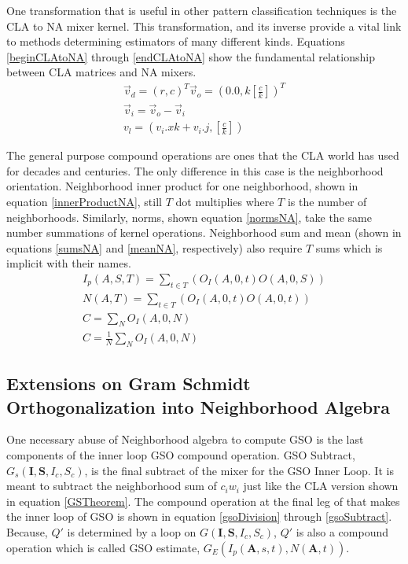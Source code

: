 \documentclass[11pt]{article}
\begin{document}
One transformation that is useful in other pattern classification techniques is the CLA to NA mixer kernel.  This transformation, and its inverse provide a vital link to methods determining estimators of many different kinds.  Equations \ref{beginCLAtoNA} through \ref{endCLAtoNA}  show the fundamental relationship between CLA matrices and NA mixers.  
\begin{eqnarray}
	\vec{v}_d = (r, c)^T \label{beginCLAtoNA}
	\vec{v}_o = (0.0, k  [\frac{c}{k}] )^T \\
	\vec{v}_i = \vec{v}_o - \vec{v}_i \\
	v_l = (v_i.x k + v_i.j , [\frac{c}{k}] )  \label{endCLAtoNA}
\end{eqnarray}

The general purpose compound operations are ones that the CLA world has used for decades and centuries.  The only difference in this case is the neighborhood orientation.  Neighborhood inner product for one neighborhood, shown in equation \ref{innerProductNA}, still $T$ dot multiplies where $T$ is the number of neighborhoods.  Similarly, norms, shown equation \ref{normsNA}, take the same number summations of kernel operations.   Neighborhood sum and mean (shown in equations \ref{sumsNA} and \ref{meanNA}, respectively) also require $T$ sums which is implicit with their names.
\begin{eqnarray}
	I_p(A, S, T) = \sum_{t \in T} (O_I(A,0,t) O(A,0,S)) \label{innerProductNA} \\
	N(A, T) = \sum_{t \in T} (O_I(A,0,t) O(A,0,t)) \label{normsNA} \\
	C = \sum _N O_I (A, 0, N ) \label{sumsNA} \\
	C = \frac{1}{N} \sum _N O_I (A, 0, N ) \label{meanNA}
\end{eqnarray}



\subsection{Extensions on Gram Schmidt Orthogonalization into Neighborhood Algebra }
One necessary abuse of Neighborhood algebra to compute GSO is the last components of the inner loop GSO compound operation.  GSO Subtract, $G_s (\mathbf{I}, \mathbf{S}, I_c, S_c)$, is the final subtract of the mixer for the GSO Inner Loop.  It is meant to subtract the neighborhood sum of $c_i w_i$ just like the CLA version shown in equation \ref{GSTheorem}.  The compound operation at the final leg of that makes the inner loop of GSO is shown in equation \ref{gsoDivision} through \ref{gsoSubtract}.  Because, $Q'$ is determined by a loop on $G(\mathbf{I}, \mathbf{S}, I_c, S_c)$, $Q'$ is also a compound operation which is called GSO estimate, $G_E(I_p(\mathbf{A},s,t), N(\mathbf{A},t))$.  
\end{document}

